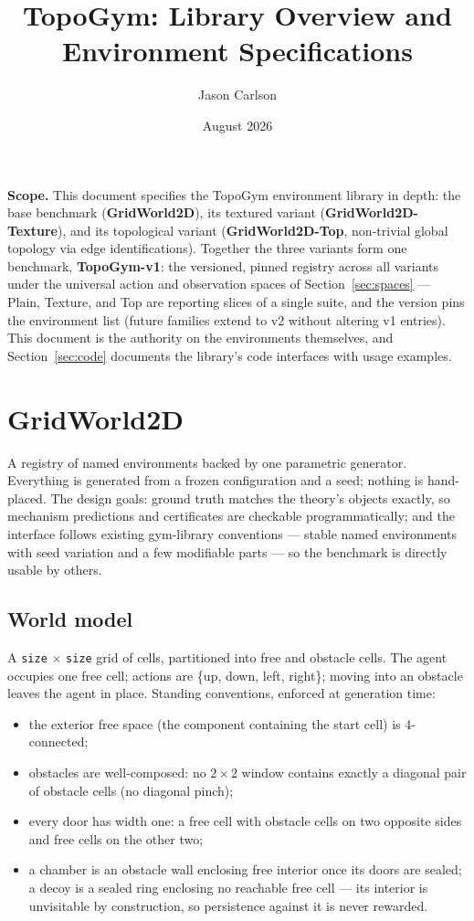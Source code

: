 \documentclass[11pt]{article}
\title{\textbf{TopoGym: Library Overview and Environment Specifications}}
\author{Jason Carlson}
\date{August 2026}
\begin{document}
\maketitle

\noindent\textbf{Scope.} This document specifies the TopoGym
environment library in depth: the base benchmark
(\textbf{GridWorld2D}), its textured variant
(\textbf{GridWorld2D-Texture}), and its topological variant
(\textbf{GridWorld2D-Top}, non-trivial global topology via edge
identifications). Together the three variants form one benchmark, \textbf{TopoGym-v1}:
the versioned, pinned registry across all variants under the
universal action and observation spaces of
Section~\ref{sec:spaces} --- Plain, Texture, and Top are reporting
slices of a single suite, and the version pins the environment list
(future families extend to v2 without altering v1 entries). This
document is the authority on the environments themselves, and
Section~\ref{sec:code} documents the library's code interfaces with
usage examples.

\section{GridWorld2D}
\label{sec:gw}

A registry of named environments backed by one parametric generator.
Everything is generated from a frozen configuration and a seed;
nothing is hand-placed. The design goals: ground truth matches
the theory's objects exactly, so mechanism predictions and
certificates are checkable programmatically; and the interface
follows existing gym-library conventions --- stable named
environments with seed variation and a few modifiable parts --- so
the benchmark is directly usable by others.

\subsection{World model}

A \texttt{size} $\times$ \texttt{size} grid of cells, partitioned
into free and obstacle cells. The agent occupies one free cell;
actions are \{up, down, left, right\}; moving into an obstacle leaves
the agent in place. Standing conventions, enforced at generation
time:
\begin{itemize}[leftmargin=2em, itemsep=1pt]
  \item the exterior free space (the component containing the start
        cell) is 4-connected;
  \item obstacles are well-composed: no $2 \times 2$ window contains
        exactly a diagonal pair of obstacle cells (no diagonal
        pinch);
  \item every door has width one: a free cell with obstacle cells on
        two opposite sides and free cells on the other two;
  \item a chamber is an obstacle wall enclosing free interior once
        its doors are sealed; a decoy is a sealed ring enclosing no
        reachable free cell --- its interior is unvisitable by
        construction, so persistence against it is never rewarded.
\end{itemize}
\end{document}
